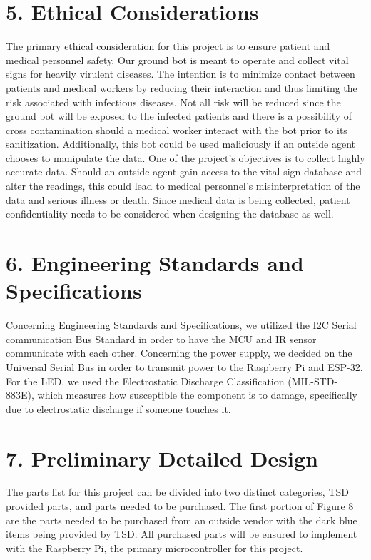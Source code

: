 ﻿\documentclass[10pt]{article}
\begin{document}
\section{5. Ethical Considerations}
The primary ethical consideration for this project is to ensure patient and medical personnel safety. Our ground bot is meant to operate and collect vital signs for heavily virulent diseases. The intention is to minimize contact between patients and medical workers by reducing their interaction and thus limiting the risk associated with infectious diseases. Not all risk will be reduced since the ground bot will be exposed to the infected patients and there is a possibility of cross contamination should a medical worker interact with the bot prior to its sanitization. Additionally, this bot could be used maliciously if an outside agent chooses to manipulate the data. One of the project’s objectives is to collect highly accurate data. Should an outside agent gain access to the vital sign database and alter the readings, this could lead to medical personnel’s misinterpretation of the data and serious illness or death. Since medical data is being collected, patient confidentiality needs to be considered when designing the database as well. 

\section{6. Engineering Standards and Specifications}
Concerning Engineering Standards and Specifications, we utilized the I2C Serial communication Bus Standard in order to have the MCU and IR sensor communicate with each other. Concerning the power supply, we decided on the Universal Serial Bus in order to transmit power to the Raspberry Pi and ESP-32. For the LED, we used the Electrostatic Discharge Classification (MIL-STD-883E), which measures how susceptible the component is to damage, specifically due to electrostatic discharge if someone touches it. 

\section{7. Preliminary Detailed Design}
The parts list for this project can be divided into two distinct categories, TSD provided parts, and parts needed to be purchased. The first portion of Figure 8 are the parts needed to be purchased from an outside vendor with the dark blue items being provided by TSD. All purchased parts will be ensured to implement with the Raspberry Pi, the primary microcontroller for this project. 
\end{document}
